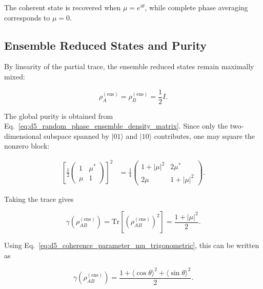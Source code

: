 The coherent state is recovered when \( \mu=e^{i\theta} \), while complete phase averaging corresponds to \( \mu=0 \).


\subsection{Ensemble Reduced States and Purity}

By linearity of the partial trace, the ensemble reduced states remain maximally mixed:

\begin{equation}
\rho_A^{(\mathrm{ens})}
=
\rho_B^{(\mathrm{ens})}
=
\frac{1}{2}I.
\label{eq:d5_random_phase_ensemble_reduced_states}
\end{equation}

The global purity is obtained from Eq.~\eqref{eq:d5_random_phase_ensemble_density_matrix}. Since only the two-dimensional subspace spanned by \( |01\rangle \) and \( |10\rangle \) contributes, one may square the nonzero block:

\begin{align}
\left[
\frac{1}{2}
\begin{pmatrix}
1 & \mu^* \\
\mu & 1
\end{pmatrix}
\right]^2
&=
\frac{1}{4}
\begin{pmatrix}
1+|\mu|^2 & 2\mu^* \\
2\mu & 1+|\mu|^2
\end{pmatrix}.
\label{eq:d5_random_phase_ensemble_block_square}
\end{align}

Taking the trace gives

\begin{equation}
\gamma\left(\rho_{AB}^{(\mathrm{ens})}\right)
=
\mathrm{Tr}\left[
\left(
\rho_{AB}^{(\mathrm{ens})}
\right)^2
\right]
=
\frac{1+|\mu|^2}{2}.
\label{eq:d5_random_phase_ensemble_purity_mu}
\end{equation}

Using Eq.~\eqref{eq:d5_coherence_parameter_mu_trigonometric}, this can be written as

\begin{equation}
\gamma\left(\rho_{AB}^{(\mathrm{ens})}\right)
=
\frac{
1
+
\langle\cos\theta\rangle^2
+
\langle\sin\theta\rangle^2
}{2}.
\label{eq:d5_random_phase_ensemble_purity_trigonometric}
\end{equation}

